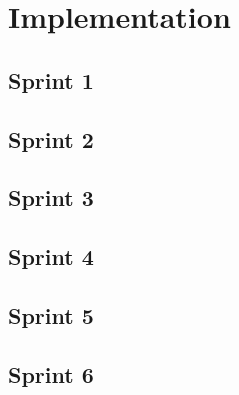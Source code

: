 \section{Implementation}
\thispagestyle{plain}

\subsection{Sprint 1}
\subsection{Sprint 2}
\subsection{Sprint 3}
\subsection{Sprint 4}
\subsection{Sprint 5}
\subsection{Sprint 6}